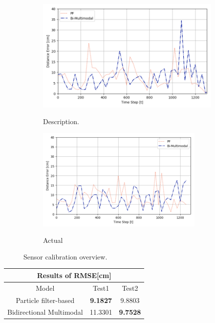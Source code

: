 \documentclass[letterpaper, 10 pt, conference]{ieeeconf}  %
\begin{document}
  \begin{figure}[h]
 	\centering
 	\begin{subfigure}[b]{.50\textwidth}
 		\centering
 		\includegraphics[width=.9\textwidth]{PF_multimodal_error1}
 		\label{fig:error1} 	
 		\caption{Description.}
 	\end{subfigure}%
 	\begin{subfigure}[b]{.50\textwidth}
 		\centering
 		\includegraphics[width=0.9\textwidth]{PF_multimodal_error2}
 		\label{fig:error2} 	
 		\caption{Actual}
 	\end{subfigure}
 	\caption{Sensor calibration overview.}
 	\label{fig:error}
 \end{figure} 
 
\begin{table}[h]
	\centering
	\begin{tabular}{cclcl}
		\hline
		\multicolumn{5}{c}{Results of RMSE{[}cm{]}}                                                                  \\ \hline
		\multicolumn{1}{c|}{Model}                    & \multicolumn{2}{c|}{Test1} & \multicolumn{2}{c}{Test2}      \\ \hline
		\multicolumn{1}{c|}{Particle filter-based}    & \multicolumn{2}{c|}{\textbf{9.1827}}     & \multicolumn{2}{c}{9.8803}          \\
		\multicolumn{1}{c|}{Bidirectional Multimodal} & \multicolumn{2}{c|}{11.3301}     & \multicolumn{2}{c}{\textbf{9.7528}}
	\end{tabular}
	\label{RMSE_table}
\end{table}
\end{document}
